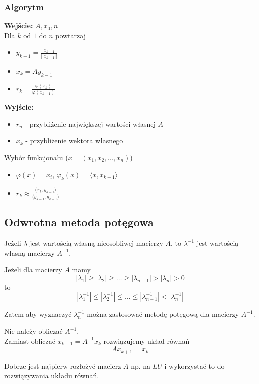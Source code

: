 \documentclass[../mn-notatki.tex]{subfiles}
\begin{document}
\subsubsection{Algorytm}
\begin{tcolorbox}
\textbf{Wejście:} $A, x_0, n$\\
Dla $k$ od $1$ do $n$ powtarzaj
\begin{itemize}
    \item $y_{k-1} = \frac{x_{k-1}}{||x_{k-1}||}$
    \item $x_k = A y_{k-1}$
    \item $r_k = \frac{\varphi(x_k)}{\varphi(x_{k-1})}$
\end{itemize}
\textbf{Wyjście:}
\begin{itemize}
    \item $r_n$ - przybliżenie największej wartości własnej $A$
    \item $x_k$ - przybliżenie wektora własnego
\end{itemize}
\vskip 0.3cm
Wybór funkcjonału ($x = (x_1, x_2, \ldots, x_n)$)
\begin{itemize}
    \item $\varphi(x) = x_i$, $\varphi_k(x) = \langle x, x_{k-1} \rangle$
    \item $r_k \approx
    \frac{\langle x_k, y_{k-1} \rangle}{\langle y_{k-1}, y_{k-1} \rangle} $
\end{itemize}

\end{tcolorbox}


\subsection{Odwrotna metoda potęgowa}
\begin{tcolorbox}
Jeżeli $\lambda$ jest wartością własną nieosobliwej macierzy $A$, to
$\lambda^{-1}$ jest wartością własną macierzy $A^{-1}$.
\end{tcolorbox}

Jeżeli dla macierzy $A$ mamy
\[
|\lambda_1| \geqslant |\lambda_2| \geqslant \ldots \geqslant
|\lambda_{n-1}|  > |\lambda_n| > 0
\]
to
\[
|\lambda_1^{-1}| \leqslant |\lambda_2^{-1}| \leqslant \ldots \leqslant
|\lambda_{n-1}^{-1}| < |\lambda_n^{-1}|
\]

Zatem aby wyznaczyć $\lambda_n^{-1}$ można zastosować metodę potęgową dla
macierzy $A^{-1}$.

\begin{tcolorbox}
Nie należy obliczać $A^{-1}$.\\

Zamiast obliczać $x_{k+1} = A^{-1} x_k$ rozwiązujemy układ równań
\[
Ax_{k+1} = x_k
\]

Dobrze jest najpierw rozłożyć macierz $A$ np. na $LU$ i wykorzystać to do
rozwiązywania układu równań.
\end{tcolorbox}
\end{document}
